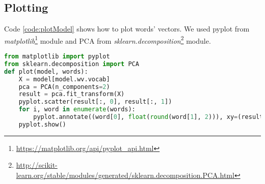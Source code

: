 \subsection{Plotting}
\label{appendix:plotModel}
Code \ref{code:plotModel} shows how to plot words' vectors. We used pyplot from \textit{matplotlib}\footnote{\url{https://matplotlib.org/api/pyplot_api.html}} module and PCA from \textit{sklearn.decomposition}\footnote{\url{http://scikit-learn.org/stable/modules/generated/sklearn.decomposition.PCA.html}} module.
\begin{lstlisting}[caption={How to plot words' vectors}, label={code:plotModel}, language=Python, breaklines=true, frame=single] 
from matplotlib import pyplot
from sklearn.decomposition import PCA
def plot(model, words):
	X = model[model.wv.vocab]
	pca = PCA(n_components=2)
	result = pca.fit_transform(X)
	pyplot.scatter(result[:, 0], result[:, 1])
	for i, word in enumerate(words):
		pyplot.annotate((word[0], float(round(word[1], 2))), xy=(result[i, 0], result[i, 1]))
	pyplot.show()
\end{lstlisting}


\listoffigures
\listoftables
